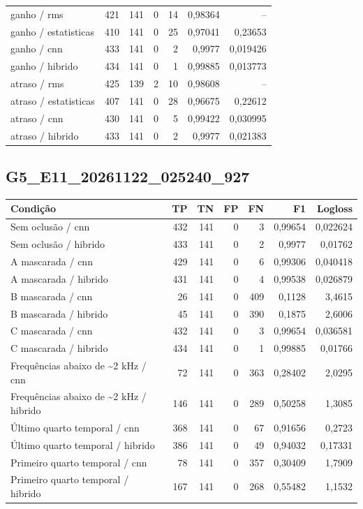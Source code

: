 \begin{longtable}{@{}p{.38\linewidth}rrrrrr@{}}
ganho /\allowbreak{} rms & 421 & 141 & 0 & 14 & 0,98364 & --\\
ganho /\allowbreak{} estatisticas & 410 & 141 & 0 & 25 & 0,97041 & 0,23653\\
ganho /\allowbreak{} cnn & 433 & 141 & 0 & 2 & 0,9977 & 0,019426\\
ganho /\allowbreak{} hibrido & 434 & 141 & 0 & 1 & 0,99885 & 0,013773\\
atraso /\allowbreak{} rms & 425 & 139 & 2 & 10 & 0,98608 & --\\
atraso /\allowbreak{} estatisticas & 407 & 141 & 0 & 28 & 0,96675 & 0,22612\\
atraso /\allowbreak{} cnn & 430 & 141 & 0 & 5 & 0,99422 & 0,030995\\
atraso /\allowbreak{} hibrido & 433 & 141 & 0 & 2 & 0,9977 & 0,021383\\
\bottomrule\end{longtable}\normalsize

\subsection{G5\_E11\_20261122\_025240\_927}
\small\begin{longtable}{@{}p{.38\linewidth}rrrrrr@{}}
\toprule Condição & TP & TN & FP & FN & F1 & Logloss\\\midrule\endhead
Sem oclusão /\allowbreak{} cnn & 432 & 141 & 0 & 3 & 0,99654 & 0,022624\\
Sem oclusão /\allowbreak{} hibrido & 433 & 141 & 0 & 2 & 0,9977 & 0,01762\\
A mascarada /\allowbreak{} cnn & 429 & 141 & 0 & 6 & 0,99306 & 0,040418\\
A mascarada /\allowbreak{} hibrido & 431 & 141 & 0 & 4 & 0,99538 & 0,026879\\
B mascarada /\allowbreak{} cnn & 26 & 141 & 0 & 409 & 0,1128 & 3,4615\\
B mascarada /\allowbreak{} hibrido & 45 & 141 & 0 & 390 & 0,1875 & 2,6006\\
C mascarada /\allowbreak{} cnn & 432 & 141 & 0 & 3 & 0,99654 & 0,036581\\
C mascarada /\allowbreak{} hibrido & 434 & 141 & 0 & 1 & 0,99885 & 0,01766\\
Frequências abaixo de \textasciitilde{}2 kHz /\allowbreak{} cnn & 72 & 141 & 0 & 363 & 0,28402 & 2,0295\\
Frequências abaixo de \textasciitilde{}2 kHz /\allowbreak{} hibrido & 146 & 141 & 0 & 289 & 0,50258 & 1,3085\\
Último quarto temporal /\allowbreak{} cnn & 368 & 141 & 0 & 67 & 0,91656 & 0,2723\\
Último quarto temporal /\allowbreak{} hibrido & 386 & 141 & 0 & 49 & 0,94032 & 0,17331\\
Primeiro quarto temporal /\allowbreak{} cnn & 78 & 141 & 0 & 357 & 0,30409 & 1,7909\\
Primeiro quarto temporal /\allowbreak{} hibrido & 167 & 141 & 0 & 268 & 0,55482 & 1,1532\\
\bottomrule\end{longtable}\normalsize

